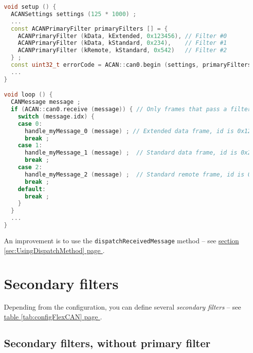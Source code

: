 \documentclass[10pt, a4paper, obeyspaces, openany]{extarticle}
\newcommand \sectionLabel[2]{\section{#1}\label{sec:#2}}
\newcommand\refSectionPage[1]{\hyperref[sec:#1]{section \ref*{sec:#1} page \pageref{sec:#1}}}
\newcommand\refTableauPage[1]{\hyperref[tab:#1]{table \ref*{tab:#1} page \pageref{tab:#1}}}
\begin{document}
{ \small\begin{lstlisting}[language=c++]
void setup () {
  ACANSettings settings (125 * 1000) ;
  ...
  const ACANPrimaryFilter primaryFilters [] = {
    ACANPrimaryFilter (kData, kExtended, 0x123456), // Filter #0
    ACANPrimaryFilter (kData, kStandard, 0x234),    // Filter #1
    ACANPrimaryFilter (kRemote, kStandard, 0x542)   // Filter #2
  } ;
  const uint32_t errorCode = ACAN::can0.begin (settings, primaryFilters, 3) ;
  ...
}

void loop () {
  CANMessage message ;
  if (ACAN::can0.receive (message)) { // Only frames that pass a filter are retrieved
    switch (message.idx) {
    case 0:
      handle_myMessage_0 (message) ; // Extended data frame, id is 0x123456
      break ;
    case 1:
      handle_myMessage_1 (message) ;  // Standard data frame, id is 0x234
      break ;
    case 2:
      handle_myMessage_2 (message) ;  // Standard remote frame, id is 0x542
      break ;
    default:
      break ;
    }
  }
  ...
}
\end{lstlisting}}

An improvement is to use the \texttt{dispatchReceivedMessage} method -- see \refSectionPage{UsingDispatchMethod}.











\sectionLabel{Secondary filters}{secondaryFilters}

Depending from the configuration, you can define several \emph{secondary filters} -- see \refTableauPage{configFlexCAN}.



\subsection{Secondary filters, without primary filter}
\end{document}
